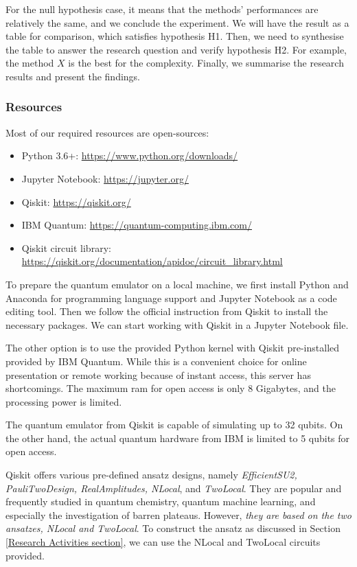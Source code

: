 For the null hypothesis case, it means that the methods' performances are relatively the same, and we conclude the experiment.
We will have the result as a table for comparison, which satisfies hypothesis H1.
Then, we need to synthesise the table to answer the research question and verify hypothesis H2.
For example, the method $X$ is the best for the complexity.
Finally, we summarise the research results and present the findings.

\subsubsection{Resources}
Most of our required resources are open-sources:
\begin{itemize}
    \item Python 3.6+: \url{https://www.python.org/downloads/}
    \item Jupyter Notebook: \url{https://jupyter.org/}
    \item Qiskit: \url{https://qiskit.org/}
    \item IBM Quantum: \url{https://quantum-computing.ibm.com/}
    \item Qiskit circuit library: \url{https://qiskit.org/documentation/apidoc/circuit_library.html}
\end{itemize}

To prepare the quantum emulator on a local machine, we first install Python and Anaconda for programming language support and Jupyter Notebook as a code editing tool.
Then we follow the official instruction from Qiskit \cite{Qiskit} to install the necessary packages.
We can start working with Qiskit in a Jupyter Notebook file.

The other option is to use the provided Python kernel with Qiskit pre-installed provided by IBM Quantum.
While this is a convenient choice for online presentation or remote working because of instant access, this server has shortcomings.
The maximum ram for open access is only 8 Gigabytes, and the processing power is limited.

The quantum emulator from Qiskit is capable of simulating up to 32 qubits.
On the other hand, the actual quantum hardware from IBM is limited to 5 qubits for open access.

Qiskit offers various pre-defined ansatz designs, namely \textit{EfficientSU2, PauliTwoDesign, RealAmplitudes, NLocal}, and \textit{TwoLocal}.
They are popular and frequently studied in quantum chemistry, quantum machine learning, and especially the investigation of barren plateaus.
However, \emph{they are based on the two ansatzes, NLocal and TwoLocal}.
To construct the ansatz as discussed in Section \ref{Research Activities section}, we can use the NLocal and TwoLocal circuits provided.


